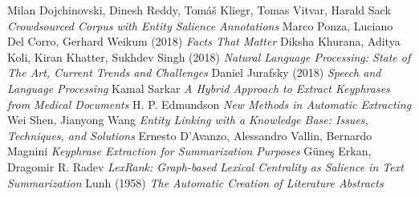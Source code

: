 \documentclass{article}
\begin{document}
	\begin{thebibliography}{unsrt}
		Milan Dojchinovski, Dinesh Reddy, Tomáš Kliegr, Tomas Vitvar, Harald Sack
		\emph{Crowdsourced Corpus with Entity Salience Annotations}
		Marco Ponza, Luciano Del Corro, Gerhard Weikum	(2018)
		\emph{Facts That Matter}
		Diksha Khurana, Aditya Koli, Kiran Khatter, Sukhdev Singh (2018)
		\emph{Natural Language Processing: State of The Art, Current Trends and Challenges}
		Daniel Jurafsky (2018) 
		\emph{Speech and Language Processing}
		Kamal Sarkar
		\emph{A Hybrid Approach to Extract Keyphrases from Medical Documents}
		H. P. Edmundson
		\emph{New Methods in Automatic Extracting}
		Wei Shen, Jianyong Wang
		\emph{Entity Linking with a Knowledge Base: Issues, Techniques, and Solutions}
		Ernesto D’Avanzo, Alessandro Vallin, Bernardo Magnini
		\emph{Keyphrase Extraction for Summarization Purposes}
		Güneş Erkan, Dragomir R. Radev
		\emph{LexRank: Graph-based Lexical Centrality as Salience in Text Summarization}
		Lunh (1958)
		\emph{The Automatic Creation of Literature Abstracts}
		
	\end{thebibliography}
\end{document}
